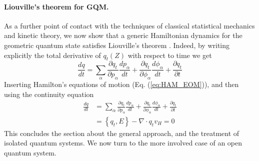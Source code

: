 \documentclass[draft,nofootinbib,pre,twocolumn,showpacs,showkeys,preprintnumbers,floatfix]{revtex4-1}
\newcommand{\1}{\mathbbm{1}}
\begin{document}
\paragraph*{Liouville's theorem for GQM.} As a further point of contact with the techniques of classical 
statistical mechanics and kinetic theory, we now show that a generic Hamiltonian dynamics for the 
geometric quantum state satisfies Liouville's theorem \cite{Soto16}. Indeed, by writing explicitly the total 
derivative of $q_t(Z)$ with respect to time we get 
\begin{equation}
\frac{d q}{d t} = \sum_\alpha \frac{\partial q_t}{\partial p_\alpha} \frac{dp_\alpha}{dt}+\frac{\partial q_t}{\partial \phi_\alpha} \frac{d\phi_\alpha}{dt} + \frac{\partial q_t}{\partial t}
\end{equation}
Inserting Hamilton's equations of motion (Eq. (\ref{eq:HAM_EOM})), and then using the continuity equation
\begin{align}
\frac{d q}{d t} &= \sum_\alpha \frac{\partial q_t}{\partial p_\alpha} \frac{dp_\alpha}{dt}+\frac{\partial q_t}{\partial \phi_\alpha} \frac{d\phi_\alpha}{dt} + \frac{\partial q_t}{\partial t}\nonumber \\
& = \left\{ q_t, E\right\} - \nabla \cdot q_t v_H = 0
\end{align}
This concludes the section about the general approach, and the treatment of isolated quantum systems.
We now turn to the more involved case of an open quantum system.


%
\end{document}
